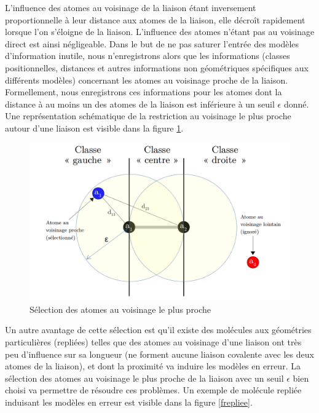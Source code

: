 \label{repr_locale_liaisons_cov_restrict}

\par L'influence des atomes au voisinage de la liaison étant inversement proportionnelle à leur distance aux atomes de la liaison, elle décroît rapidement lorsque l'on s'éloigne de la liaison. L'influence des atomes n'étant pas au voisinage direct est ainsi négligeable. Dans le but de ne pas saturer l'entrée des modèles d'information inutile, nous n'enregistrons alors que les informations (classes positionnelles, distances et autres informations non géométriques spécifiques aux différents modèles) concernant les atomes au voisinage proche de la liaison. Formellement, nous enregistrons ces informations pour les atomes dont la distance à au moins un des atomes de la liaison est inférieure à un seuil $\epsilon$  donné. Une représentation schématique de la restriction au voisinage le plus proche autour d'une liaison est visible dans la figure \ref{fschema_restrict}.\\

\begin{figure}
	\centering
	\includegraphics[scale=0.35]{images/classes_pos_3.png}
	\caption{Sélection des atomes au voisinage le plus proche}
	\label{fschema_restrict}
\end{figure}



\par Un autre avantage de cette sélection est qu'il existe des molécules aux géométries particulières (repliées) telles que des atomes au voisinage d'une liaison ont très peu d'influence sur sa longueur (ne forment aucune liaison covalente avec les deux atomes de la liaison), et dont la proximité va induire les modèles en erreur. La sélection des atomes au voisinage le plus proche de la liaison avec un seuil $\epsilon$ bien choisi va permettre de résoudre ces problèmes. Un exemple de molécule repliée induisant les modèles en erreur est visible dans la figure \ref{frepliee}.


